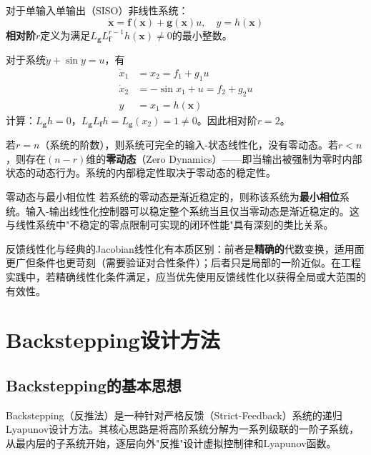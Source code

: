对于单输入单输出（SISO）非线性系统：
\[
\dot{\mathbf{x}} = \mathbf{f}(\mathbf{x}) + \mathbf{g}(\mathbf{x})u,\quad y = h(\mathbf{x})
\]
\textbf{相对阶}$r$定义为满足$L_{\mathbf{g}}L_{\mathbf{f}}^{r-1}h(\mathbf{x}) \neq 0$的最小整数。

\begin{example}[相对阶的计算]
对于系统$\ddot{y} + \sin y = u$，有
\begin{align*}
\dot{x}_1 &= x_2 = f_1 + g_1 u\\
\dot{x}_2 &= -\sin x_1 + u = f_2 + g_2 u\\
y &= x_1 = h(\mathbf{x})
\end{align*}
计算：$L_{\mathbf{g}}h = 0$，$L_{\mathbf{g}}L_{\mathbf{f}}h = L_{\mathbf{g}}(x_2) = 1 \neq 0$。因此相对阶$r = 2$。
\end{example}

若$r = n$（系统的阶数），则系统可完全的输入-状态线性化，没有零动态。若$r < n$，则存在$(n-r)$维的\textbf{零动态}（Zero Dynamics）——即当输出被强制为零时内部状态的动态行为。系统的内部稳定性取决于零动态的稳定性。

\begin{myTheorem}{零动态与最小相位性}
若系统的零动态是渐近稳定的，则称该系统为\textbf{最小相位}系统。输入-输出线性化控制器可以稳定整个系统当且仅当零动态是渐近稳定的。这与线性系统中"不稳定的零点限制可实现的闭环性能"具有深刻的类比关系。
\end{myTheorem}

\begin{remark}
反馈线性化与经典的Jacobian线性化有本质区别：前者是\textbf{精确的}代数变换，适用面更广但条件也更苛刻（需要验证对合性条件）；后者只是局部的一阶近似。在工程实践中，若精确线性化条件满足，应当优先使用反馈线性化以获得全局或大范围的有效性。
\end{remark}

\section{Backstepping设计方法}

\subsection{Backstepping的基本思想}

Backstepping（反推法）是一种针对严格反馈（Strict-Feedback）系统的递归Lyapunov设计方法。其核心思路是将高阶系统分解为一系列级联的一阶子系统，从最内层的子系统开始，逐层向外"反推"设计虚拟控制律和Lyapunov函数。

